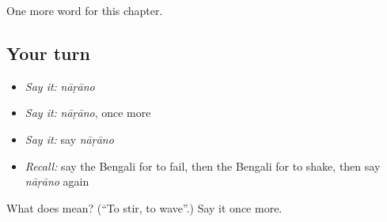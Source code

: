 \begin{grammarlens}[title={What you've built}]
One more word for this chapter.
\end{grammarlens}

\subsection*{Your turn}
\begin{itemize}
\raggedright
  \item \emph{Say it:} \emph{nāṛāno}
  \item \emph{Say it:} \emph{nāṛāno}, once more
  \item \emph{Say it:} say \emph{nāṛāno}
  \item \emph{Recall:} say the Bengali for to fail, then the Bengali for to shake, then say \emph{nāṛāno} again
\end{itemize}

\begin{tcolorbox}[breakable,colback=teal!4,colframe=teal!35!black,title={Before you move on}]
What does  mean? (\textquotedblleft{}To stir, to wave\textquotedblright{}.) Say it once more.
\end{tcolorbox}
